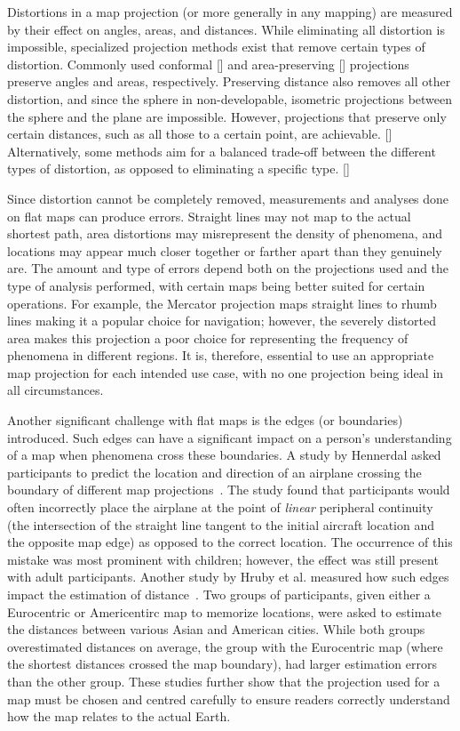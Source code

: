Distortions in a map projection (or more generally in any mapping) are measured by their effect on angles, areas, and distances.
While eliminating all distortion is impossible, specialized projection methods exist that remove certain types of distortion.
Commonly used conformal [] and area-preserving [] projections preserve angles and areas, respectively.
Preserving distance also removes all other distortion, and since the sphere in non-developable, isometric projections between the sphere and the plane are impossible.
However, projections that preserve only certain distances, such as all those to a certain point, are achievable. []
Alternatively, some methods aim for a balanced trade-off between the different types of distortion, as opposed to eliminating a specific type. []
\cite{mathematics paper on distortion}
\cite{planar area preserving}
\cite{planar conformal}


Since distortion cannot be completely removed, measurements and analyses done on flat maps can produce errors.
Straight lines may not map to the actual shortest path, area distortions may misrepresent the density of phenomena, and locations may appear much closer together or farther apart than they genuinely are.
The amount and type of errors depend both on the projections used and the type of analysis performed, with certain maps being better suited for certain operations.
For example, the Mercator projection maps straight lines to rhumb lines making it a popular choice for navigation; however, the severely distorted area makes this projection a poor choice for representing the frequency of phenomena in different regions.
It is, therefore, essential to use an appropriate map projection for each intended use case, with no one projection being ideal in all circumstances.


Another significant challenge with flat maps is the edges (or boundaries) introduced.
Such edges can have a significant impact on a person's understanding of a map when phenomena cross these boundaries.
A study by Hennerdal asked participants to predict the location and direction of an airplane crossing the boundary of different map projections~\cite{hennerdal2015beyond}.
The study found that participants would often incorrectly place the airplane at the point of \textit{linear} peripheral continuity (the intersection of the straight line tangent to the initial aircraft location and the opposite map edge) as opposed to the correct location.
The occurrence of this mistake was most prominent with children; however, the effect was still present with adult participants. Another study by Hruby et al. measured how such edges impact the estimation of distance~\cite{hruby2016journey}.
Two groups of participants, given either a Eurocentric or Americentirc map to memorize locations, were asked to estimate the distances between various Asian and American cities.
While both groups overestimated distances on average, the group with the Eurocentric map (where the shortest distances crossed the map boundary), had larger estimation errors than the other group.
These studies further show that the projection used for a map must be chosen and centred carefully to ensure readers correctly understand how the map relates to the actual Earth.


